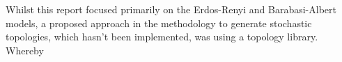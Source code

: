 Whilst this report focused primarily on the Erdos-Renyi and Barabasi-Albert models, a proposed approach in the methodology to generate stochastic topologies, which hasn't been implemented, was using a topology library. Whereby 





